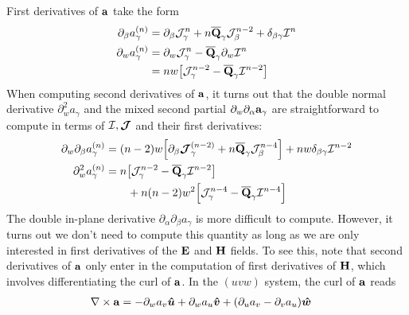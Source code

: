 \documentclass[letterpaper]{article}
\begin{document}
First derivatives of $\mathbf{a}$ take the form
\begin{align*}
 \partial_\beta a_\gamma^{(n)}
&=   \partial_\beta \mathcal{J}^n_\gamma
   + n\overline{\mathbf{Q}}_\gamma \mathcal{J}^{n-2}_\beta
   + \delta_{\beta\gamma} \mathcal{I}^n
\\
 \partial_w a_\gamma^{(n)}
&=   \partial_w \mathcal{J}^n_\gamma
   - \overline{\mathbf{Q}}_\gamma \partial_w \mathcal{I}^n
\\
&=   nw\big[    \mathcal{J}^{n-2}_\gamma
              - \overline{\mathbf{Q}}_\gamma \mathcal{I}^{n-2}
       \big]
\end{align*}
When computing second derivatives of $\mathbf{a}$, it turns
out that the double normal derivative $\partial^2_w a_\gamma$
and the mixed second partial $\partial_w \partial_\alpha \mathbf{a}_\gamma$
are straightforward to compute in terms of $\mathcal{I},\boldsymbol{\mathcal{J}}$
and their first derivatives:
\begin{align*}
 \partial_w \partial_\beta a_\gamma^{(n)}
&= (n-2)w \Big[ \partial_\beta \boldsymbol{\mathcal{J}}_\gamma^{(n-2)}
               +n\overline{\mathbf{Q}}_\gamma \mathcal{J}_\beta^{n-4}
          \Big]
   +nw \delta_{\beta\gamma} \mathcal{I}^{n-2}
\\
 \partial_w^2 a_\gamma^{(n)}
&=   n\big[    \mathcal{J}^{n-2}_\gamma
             - \overline{\mathbf{Q}}_\gamma \mathcal{I}^{n-2}
      \big]
\\
&\qquad
  +n(n-2) w^2 
   \Big[ \mathcal{J}^{n-4}_\gamma -\overline{\mathbf{Q}}_\gamma \mathcal{I}^{n-4}\Big]
\end{align*}
The double in-plane derivative $\partial_\alpha \partial_\beta a_\gamma$ 
is more difficult to compute. However,
it turns out we don't need to compute this quantity as long as 
we are only interested in first derivatives of the 
$\mathbf{E}$ and $\mathbf{H}$ fields. To see this, note that second 
derivatives of $\mathbf{a}$ only enter in the computation of 
first derivatives of $\mathbf{H}$, which involves differentiating
the curl of $\mathbf{a}$. In the $(uvw)$ system, the curl of $\mathbf{a}$ 
reads
\begin{align*}
 \nabla\times \mathbf{a}
 &= -\partial_w a_v \boldsymbol{\hat{u}} 
    +\partial_w a_u \boldsymbol{\hat{v}} 
    +(\partial_u a_v - \partial_v a_u) \boldsymbol{\hat{w}}
\end{align*}
\end{document}
